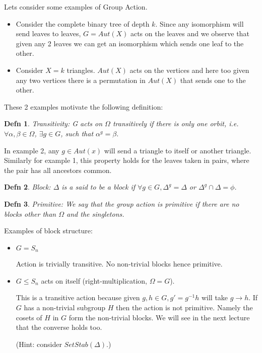 \newtheorem{defn}{Defn}
\setlength{\parindent}{0pt}

Lets consider some examples of Group Action.

\begin{itemize}
\item
Consider the complete binary tree of depth $k$. Since any isomorphism will send leaves to leaves, $G = Aut(X)$ acts on the leaves and we observe that given any 2 leaves we can get an isomorphism which sends one leaf to the other.\\

\item
Consider $X = k$ triangles. $Aut(X)$ acts on the vertices and here too given any two vertices there is a permutation in $Aut(X)$ that sends one to the other. \\

\end{itemize}


These 2 examples motivate the following definition:

\begin{defn}{Transitivity:}
G acts on $\Omega$ transitively if there is only one orbit, i.e. $\forall \alpha,\beta \in \Omega$, $\exists g \in G$, such that $\alpha^g = \beta$.
\end{defn}


In example 2, any $g \in Aut(x)$ will send a triangle to itself or another triangle. Similarly for example 1, this property holds for the leaves taken in pairs, where the pair has all ancestors common.\\

\begin{defn}{Block:}
$\Delta$ is a said to be a block if $\forall g \in G, \Delta^g = \Delta$ or $\Delta^g \cap \Delta = \phi$.
\end{defn}

\begin{defn}{Primitive:}
We say that the group action is primitive if there are no blocks other than $\Omega$ and the singletons. 
\end{defn}

Examples of block structure:

\begin{itemize}
\item
$G = S_n$ 

Action is trivially transitive. No non-trivial blocks hence primitive.

\item
$G \leq S_n$ acts on itself (right-multiplication, $\Omega = G$).

This is a transitive action because given $g,h \in G, g' = g^{-1}h$ will take $g \rightarrow h$. If $G$ has a non-trivial subgroup $H$ then the action is not primitive. Namely the cosets of $H$ in $G$ form the non-trivial blocks. We will see in the next lecture that the converse holds too. 

({\sf Hint}: consider $SetStab(\Delta)$.)

\end{itemize}

